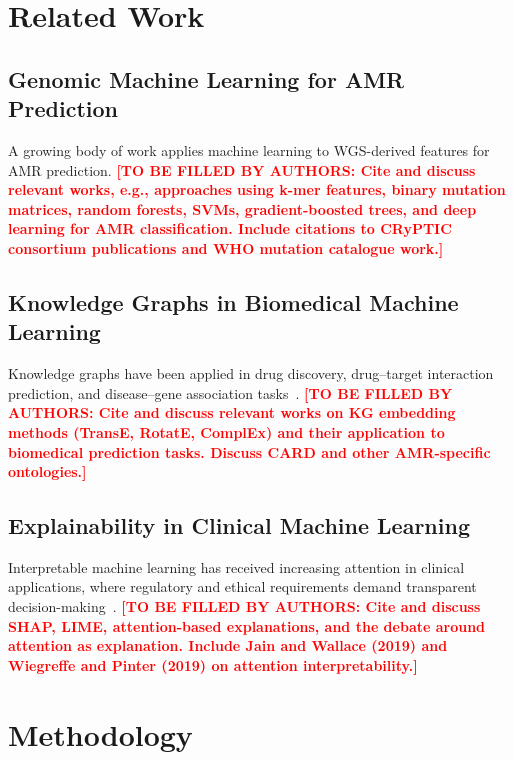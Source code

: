 \documentclass[conference]{IEEEtran}
\newcommand{\tbd}[1]{\textcolor{red}{\textbf{[TO BE FILLED BY AUTHORS: #1]}}}
\begin{document}
\section{Related Work}

\subsection{Genomic Machine Learning for AMR Prediction}

A growing body of work applies machine learning to WGS-derived features for AMR prediction. \tbd{Cite and discuss relevant works, e.g., approaches using k-mer features, binary mutation matrices, random forests, SVMs, gradient-boosted trees, and deep learning for AMR classification. Include citations to CRyPTIC consortium publications and WHO mutation catalogue work.}

\subsection{Knowledge Graphs in Biomedical Machine Learning}

Knowledge graphs have been applied in drug discovery, drug--target interaction prediction, and disease--gene association tasks~\cite{ref_kg_biomed}. \tbd{Cite and discuss relevant works on KG embedding methods (TransE, RotatE, ComplEx) and their application to biomedical prediction tasks. Discuss CARD and other AMR-specific ontologies.}

\subsection{Explainability in Clinical Machine Learning}

Interpretable machine learning has received increasing attention in clinical applications, where regulatory and ethical requirements demand transparent decision-making~\cite{ref_xai_clinical}. \tbd{Cite and discuss SHAP, LIME, attention-based explanations, and the debate around attention as explanation. Include Jain and Wallace (2019) and Wiegreffe and Pinter (2019) on attention interpretability.}

\section{Methodology}
\end{document}

